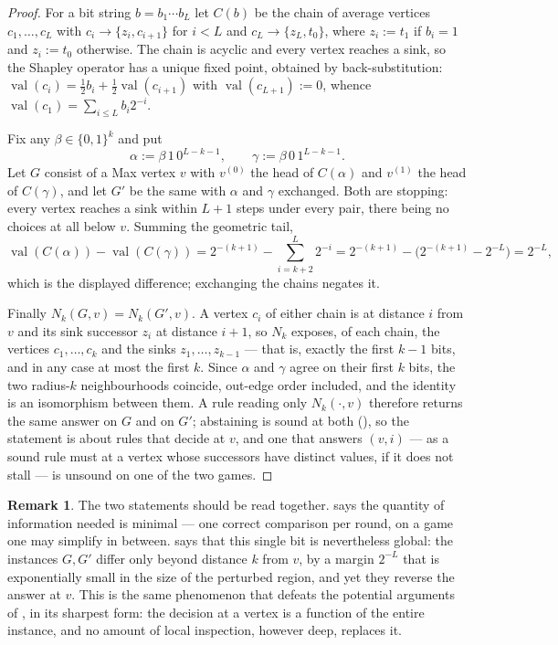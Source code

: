 \documentclass[11pt]{article}
\theoremstyle{plain}
\theoremstyle{definition}
\newtheorem{remark}[theorem]{Remark}
\DeclareMathOperator{\val}{val}
\begin{document}
\begin{proof}
For a bit string $b=b_1\cdots b_L$ let $C(b)$ be the chain of average
vertices $c_1,\dots,c_L$ with $c_i\to\{z_i,c_{i+1}\}$ for $i<L$ and
$c_L\to\{z_L,t_0\}$, where $z_i:=t_1$ if $b_i=1$ and $z_i:=t_0$
otherwise. The chain is acyclic and every vertex reaches a sink, so the
Shapley operator has a unique fixed point, obtained by back-substitution:
$\val(c_i)=\tfrac12 b_i+\tfrac12\val(c_{i+1})$ with $\val(c_{L+1}):=0$,
whence $\val(c_1)=\sum_{i\le L}b_i2^{-i}$.

Fix any $\beta\in\{0,1\}^{k}$ and put
\[
  \alpha:=\beta\,1\,0^{L-k-1},\qquad
  \gamma:=\beta\,0\,1^{L-k-1}.
\]
Let $G$ consist of a Max vertex $v$ with $v^{(0)}$ the head of $C(\alpha)$
and $v^{(1)}$ the head of $C(\gamma)$, and let $G'$ be the same with
$\alpha$ and $\gamma$ exchanged. Both are stopping: every vertex reaches a
sink within $L+1$ steps under every pair, there being no choices at all
below $v$. Summing the geometric tail,
\[
  \val(C(\alpha))-\val(C(\gamma))
  =2^{-(k+1)}-\sum_{i=k+2}^{L}2^{-i}
  =2^{-(k+1)}-\bigl(2^{-(k+1)}-2^{-L}\bigr)=2^{-L},
\]
which is the displayed difference; exchanging the chains negates it.

Finally $N_k(G,v)=N_k(G',v)$. A vertex $c_i$ of either chain is at
distance $i$ from $v$ and its sink successor $z_i$ at distance $i+1$, so
$N_k$ exposes, of each chain, the vertices $c_1,\dots,c_k$ and the sinks
$z_1,\dots,z_{k-1}$ --- that is, exactly the first $k-1$ bits, and in any
case at most the first $k$. Since $\alpha$ and $\gamma$ agree on their
first $k$ bits, the two radius-$k$ neighbourhoods coincide, out-edge
order included, and the identity is an isomorphism between them. A rule
reading only $N_k(\cdot,v)$ therefore returns the same answer on $G$ and
on $G'$; abstaining is sound at both (), so the
statement is about rules that decide at $v$, and one that answers
$(v,i)$ --- as a sound rule must at a vertex whose successors have
distinct values, if it does not stall --- is unsound on one of the two
games.
\end{proof}

\begin{remark}
The two statements should be read together. 
says the quantity of information needed is minimal --- one correct
comparison per round, on a game one may simplify in between.
 says that this single bit is nevertheless global:
the instances $G,G'$ differ only beyond distance $k$ from $v$, by a
margin $2^{-L}$ that is exponentially small in the size of the
perturbed region, and yet they reverse the answer at $v$. This is the
same phenomenon that defeats the potential arguments of
, in its sharpest form: the decision at a vertex is
a function of the entire instance, and no amount of local inspection,
however deep, replaces it.
\end{remark}
\end{document}

